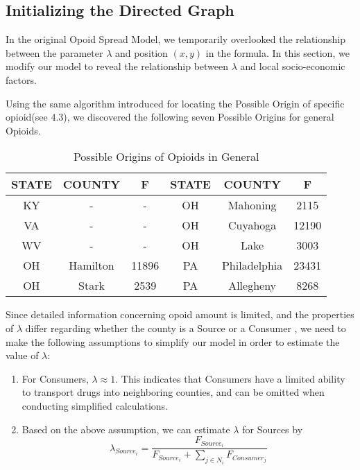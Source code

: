 \subsection{Initializing the Directed Graph}
In the original Opoid Spread Model, we temporarily overlooked the relationship between the parameter $\lambda$ and position $(x,y)$ in the formula. In this section, we modify our model to reveal the relationship between $\lambda$ and local socio-economic factors. 

Using the same algorithm introduced for locating the Possible Origin of specific opioid(see 4.3), we discovered the following seven Possible Origins for general Opioids.

\begin{table}[H]
	\centering
	\begin{tabular}{|c|c|c||c|c|c|}
		\hline
		\rowcolor[HTML]{656565} 
		{\color[HTML]{FFFFFF} \textbf{STATE}} & {\color[HTML]{FFFFFF} \textbf{COUNTY}} & {\color[HTML]{FFFFFF} \textbf{F}} &{\color[HTML]{FFFFFF} \textbf{STATE}} & {\color[HTML]{FFFFFF} \textbf{COUNTY}} & {\color[HTML]{FFFFFF} \textbf{F}}\\ \hline
		KY & - & - &OH & Mahoning & 2115 \\ \hline
		VA & - & - &OH & Cuyahoga & 12190\\ \hline
		WV & - & - &OH& Lake &3003 \\ \hline
		OH & Hamilton & 11896 &PA & Philadelphia & 23431 \\ \hline
		OH & Stark & 2539 & PA & Allegheny & 8268 \\ \hline
	\end{tabular}
	\centering
	\caption{Possible Origins of Opioids in General}
\end{table}

Since detailed information concerning opoid amount is limited, and the properties of $\lambda$ differ regarding whether the county is a Source or a Consumer , we need to make the following assumptions to simplify our model in order to estimate the value of $\lambda$:

\begin{enumerate}
	\item For Consumers, $\lambda \approx 1$. This indicates that Consumers have a limited ability to transport drugs into neighboring counties, and can be omitted when conducting simplified calculations.
	
	\item Based on the above assumption, we can estimate $\lambda$ for Sources by
	\begin{equation}
	\lambda_{Source_i}=\frac{F_{Source_i}}{F_{Source_i}+\sum_{j\in N_i} F_{Consumer_j}}
	\end{equation} 
\end{enumerate}

